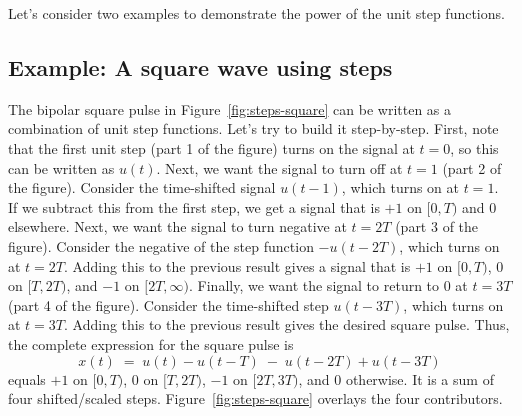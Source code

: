 Let's consider two examples to demonstrate the power of the unit step functions. 
\subsection{Example: A square wave using steps}
 The bipolar square pulse in Figure~\ref{fig:steps-square} can be written as a combination of unit step functions. Let's try to build it step-by-step. First, note that the first unit step (part 1 of the figure) turns on the signal at $t=0$, so this can be written as $u(t)$. Next, we want the signal to turn off at $t=1$ (part 2 of the figure). Consider the time-shifted signal $u(t-1)$, which turns on at $t=1$. If we subtract this from the first step, we get a signal that is $+1$ on $[0,T)$ and $0$ elsewhere. Next, we want the signal to turn negative at $t=2T$ (part 3 of the figure). Consider the negative of the step function $-u(t-2T)$, which turns on at $t=2T$. Adding this to the previous result gives a signal that is $+1$ on $[0,T)$, $0$ on $[T,2T)$, and $-1$ on $[2T,\infty)$. Finally, we want the signal to return to $0$ at $t=3T$ (part 4 of the figure). Consider the time-shifted step $u(t-3T)$, which turns on at $t=3T$. Adding this to the previous result gives the desired square pulse. Thus, the complete expression for the square pulse is
\[
x(t) \;=\; u(t)-u(t-T)\;-\;u(t-2T)+u(t-3T)
\]
equals $+1$ on $[0,T)$, $0$ on $[T,2T)$, $-1$ on $[2T,3T)$, and $0$ otherwise.
It is a sum of four shifted/scaled steps. Figure~\ref{fig:steps-square} overlays the four contributors.

